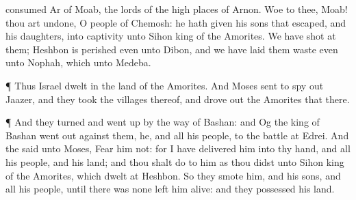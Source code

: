 {consumed
Ar of
Moab,
{} the lords of the high
places of
Arnon.
Woe to thee,
Moab! thou art
undone, O
people of
Chemosh: he hath
given his
sons that
escaped, and his
daughters, into
captivity unto
Sihon
king of the
Amorites.
We have
shot at them;
Heshbon is
perished even unto
Dibon, and we have laid them
waste even unto
Nophah, which
{} unto
Medeba.
\par }{\PP {}¶ Thus
Israel
dwelt in the
land of the
Amorites.
And
Moses
sent to spy
out
Jaazer, and they
took the
villages thereof, and drove
out the
Amorites that
{} there.
\par }{\PP {}¶ And they
turned and went
up by the
way of
Bashan: and
Og the
king of
Bashan went
out
against them, he, and all his
people, to the
battle at
Edrei.
And the
{}
said unto
Moses,
Fear him not: for I have
delivered him into thy
hand, and all his
people, and his
land; and thou shalt
do to him as thou
didst unto
Sihon
king of the
Amorites, which
dwelt at
Heshbon.
So they
smote him, and his
sons, and all his
people, until there was
none
left him
alive: and they
possessed his
land.

}
